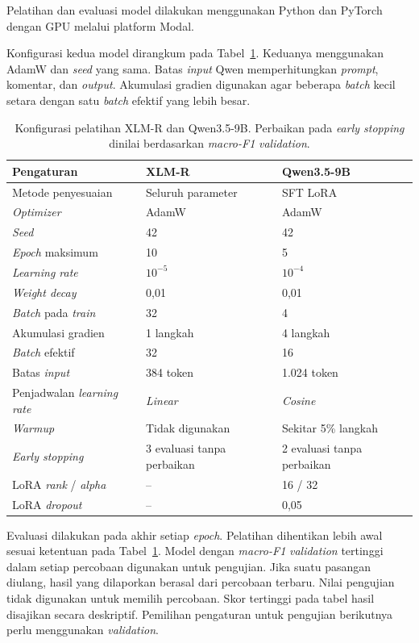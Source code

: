 \documentclass[11pt]{article}
\begin{document}
Pelatihan dan evaluasi model dilakukan menggunakan Python dan PyTorch dengan GPU melalui platform Modal.

Konfigurasi kedua model dirangkum pada Tabel~\ref{tab:configuration}. Keduanya menggunakan AdamW \citep{loshchilov-hutter-2019-decoupled} dan \textit{seed} yang sama. Batas \textit{input} Qwen memperhitungkan \textit{prompt}, komentar, dan \textit{output}. Akumulasi gradien digunakan agar beberapa \textit{batch} kecil setara dengan satu \textit{batch} efektif yang lebih besar.

\begin{table}[t]
\centering
\small
\begin{tabular}{lll}
\toprule
Pengaturan & XLM-R & Qwen3.5-9B \\
\midrule
Metode penyesuaian & Seluruh parameter & SFT LoRA \\
\textit{Optimizer} & AdamW & AdamW \\
\textit{Seed} & 42 & 42 \\
\textit{Epoch} maksimum & 10 & 5 \\
\textit{Learning rate} & $10^{-5}$ & $10^{-4}$ \\
\textit{Weight decay} & 0,01 & 0,01 \\
\textit{Batch} pada \textit{train} & 32 & 4 \\
Akumulasi gradien & 1 langkah & 4 langkah \\
\textit{Batch} efektif & 32 & 16 \\
Batas \textit{input} & 384 token & 1.024 token \\
Penjadwalan \textit{learning rate} & \textit{Linear} & \textit{Cosine} \\
\textit{Warmup} & Tidak digunakan & Sekitar 5\% langkah \\
\textit{Early stopping} & 3 evaluasi tanpa perbaikan & 2 evaluasi tanpa perbaikan \\
LoRA \textit{rank} / \textit{alpha} & -- & 16 / 32 \\
LoRA \textit{dropout} & -- & 0,05 \\
\bottomrule
\end{tabular}
\caption{Konfigurasi pelatihan XLM-R dan Qwen3.5-9B. Perbaikan pada \textit{early stopping} dinilai berdasarkan \textit{macro-F1} \textit{validation}.}
\label{tab:configuration}
\end{table}

Evaluasi dilakukan pada akhir setiap \textit{epoch}. Pelatihan dihentikan lebih awal sesuai ketentuan pada Tabel~\ref{tab:configuration}. Model dengan \textit{macro-F1} \textit{validation} tertinggi dalam setiap percobaan digunakan untuk pengujian. Jika suatu pasangan diulang, hasil yang dilaporkan berasal dari percobaan terbaru. Nilai pengujian tidak digunakan untuk memilih percobaan. Skor tertinggi pada tabel hasil disajikan secara deskriptif. Pemilihan pengaturan untuk pengujian berikutnya perlu menggunakan \textit{validation}.
\end{document}
